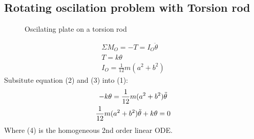 \documentclass[11pt, a4paper]{article}
\begin{document}
\subsection{Rotating oscilation problem with Torsion rod}
\setcounter{equation}{0}
\begin{figure}[h]
  \centering
  \qquad
  \caption{Oscilating plate on a torsion rod}
\end{figure}
\begin{gather}
  \Sigma M_O = -T = I_O\ddot{\theta}\\
  T = k\theta\\
  I_O = \frac{1}{12}m(a^2 + b^2)
\end{gather}
Subsitute equation (2) and (3) into (1):
\begin{gather}
  -k\theta = \frac{1}{12}m(a^2 + b^2)\ddot{\theta} \notag \\
  \frac{1}{12}m(a^2 + b^2)\ddot{\theta} + k\theta = 0
\end{gather}
Where (4) is the homogeneous 2nd order linear ODE.
\end{document}
